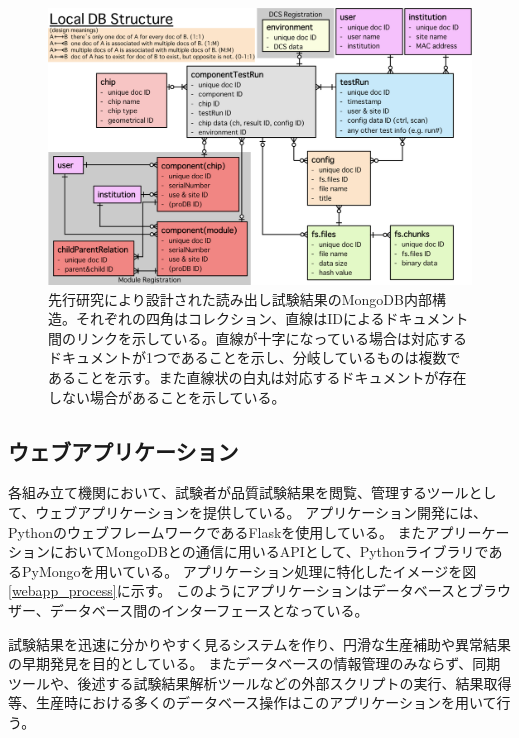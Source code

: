 \begin{figure}[bpt]\centering
\includegraphics[width=12cm]{./localdb_structure_detail.png}
\caption[先行研究により設計された読み出し試験結果のMongoDB内部構造]{先行研究により設計された読み出し試験結果のMongoDB内部構造\cite{4-6}。それぞれの四角はコレクション、直線はIDによるドキュメント間のリンクを示している。直線が十字になっている場合は対応するドキュメントが1つであることを示し、分岐しているものは複数であることを示す。また直線状の白丸は対応するドキュメントが存在しない場合があることを示している。}
\label{localdb_structure_detail}
\end{figure}

\clearpage
\subsection{ウェブアプリケーション} \label{sec:web_app}

各組み立て機関において、試験者が品質試験結果を閲覧、管理するツールとして、ウェブアプリケーションを提供している。
アプリケーション開発には、PythonのウェブフレームワークであるFlaskを使用している。
またアプリーケーションにおいてMongoDBとの通信に用いるAPIとして、PythonライブラリであるPyMongo\cite{4-4}を用いている。
アプリケーション処理に特化したイメージを図\ref{webapp_process}に示す。
このようにアプリケーションはデータベースとブラウザー、データベース間のインターフェースとなっている。

試験結果を迅速に分かりやすく見るシステムを作り、円滑な生産補助や異常結果の早期発見を目的としている。
またデータベースの情報管理のみならず、同期ツールや、後述する試験結果解析ツールなどの外部スクリプトの実行、結果取得等、生産時における多くのデータベース操作はこのアプリケーションを用いて行う。

